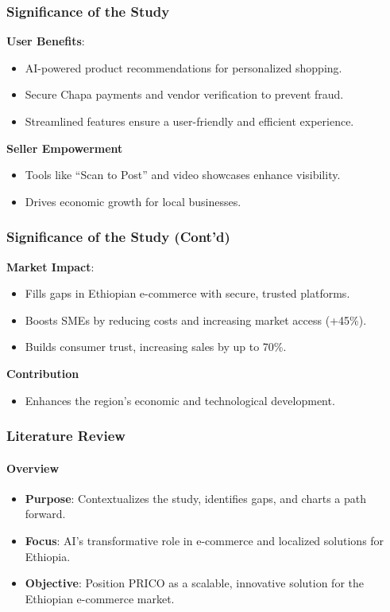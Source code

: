 \documentclass{beamer}
\begin{document}
\begin{frame}
	\frametitle{Significance of the Study}
	\textbf{User Benefits}:
	\begin{itemize}
		\item AI-powered product recommendations for personalized shopping.
		\item Secure Chapa payments and vendor verification to prevent fraud.
		\item Streamlined features ensure a user-friendly and efficient experience.
	\end{itemize}
	\textbf{Seller Empowerment}
	\begin{itemize}
		\item Tools like “Scan to Post” and video showcases enhance visibility.
		\item Drives economic growth for local businesses.
	\end{itemize}
\end{frame}

\begin{frame}
	\frametitle{Significance of the Study (Cont'd)}
	\textbf{Market Impact}:
	\begin{itemize}
		\item Fills gaps in Ethiopian e-commerce with secure, trusted platforms.
		\item Boosts SMEs by reducing costs and increasing market access (+45\%).
		\item Builds consumer trust, increasing sales by up to 70\%.
	\end{itemize}
	\textbf{Contribution}
	\begin{itemize}
		\item Enhances the region's economic and technological development.
	\end{itemize}
\end{frame}

\begin{frame}
	\frametitle{Literature Review}
	\framesubtitle{Overview}
	\begin{itemize}
		\item\textbf{Purpose}: Contextualizes the study, identifies gaps, and charts a path forward.
		\item\textbf{Focus}: AI's transformative role in e-commerce and localized solutions for Ethiopia.
		\item\textbf{Objective}: Position PRICO as a scalable, innovative solution for the Ethiopian e-commerce market.
	\end{itemize}
\end{frame}
\end{document}
